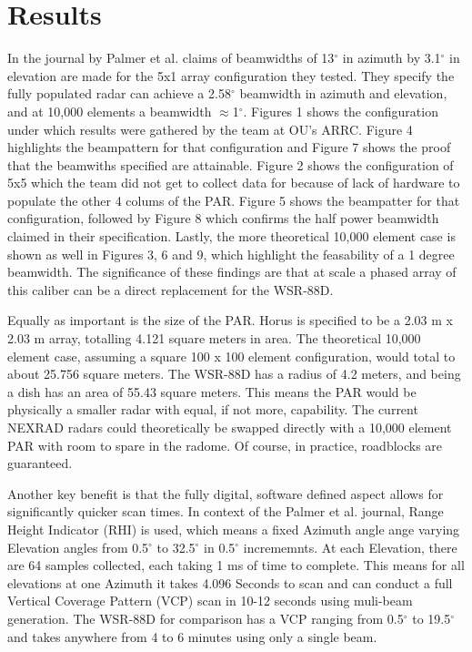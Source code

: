 \documentclass[conference]{IEEEtran}
\begin{document}
\section{Results}
\par  In the journal by Palmer et al. \cite{b1} claims of beamwidths of 13$^\circ$ in azimuth by 3.1$^\circ$ in elevation are made for the 5x1 array configuration they tested. They specify the fully populated radar can achieve a 2.58$^\circ$ beamwidth in azimuth and elevation, and at 10,000 elements a beamwidth $\approx$1$^\circ$. Figures 1 shows the configuration under which results were gathered by the team at OU's ARRC. Figure 4 highlights the beampattern for that configuration and Figure 7 shows the proof that the beamwiths specified are attainable. Figure 2 shows the configuration of 5x5 which the team did not get to collect data for because of lack of hardware to populate the other 4 colums of the PAR. Figure 5 shows the beampatter for that configuration, followed by Figure 8 which confirms the half power beamwidth claimed in their specification. Lastly, the more theoretical 10,000 element case is shown as well in Figures 3, 6 and 9, which highlight the feasability of a 1 degree beamwidth. The significance of these findings are that at scale a phased array of this caliber can be a direct replacement for the WSR-88D.
\par Equally as important is the size of the PAR. Horus is specified to be a 2.03 m x 2.03 m array, totalling 4.121 square meters in area. The theoretical 10,000 element case, assuming a square 100 x 100 element configuration, would total to about 25.756 square meters. The WSR-88D has a radius of 4.2 meters, and being a dish has an area of 55.43 square meters. This means the PAR would be physically a smaller radar with equal, if not more, capability. The current NEXRAD radars could theoretically be swapped directly with a 10,000 element PAR with room to spare in the radome. Of course, in practice, roadblocks are guaranteed. 
\par Another key benefit is that the fully digital, software defined aspect allows for significantly quicker scan times. In context of the Palmer et al. journal, Range Height Indicator (RHI) is used, which means a fixed Azimuth angle ange varying Elevation angles from 0.5$^\circ$ to 32.5$^\circ$ in 0.5$^\circ$ incrememnts. At each Elevation, there are 64 samples collected, each taking 1 ms of time to complete. This means for all elevations at one Azimuth it takes 4.096 Seconds to scan and can conduct a full Vertical Coverage Pattern (VCP) scan in 10-12 seconds\cite{b4} using muli-beam generation\cite{b6}. The WSR-88D for comparison has a VCP ranging from 0.5$^\circ$ to 19.5$^\circ$ and takes anywhere from 4 to 6 minutes\cite{b5} using only a single beam.
\end{document}
